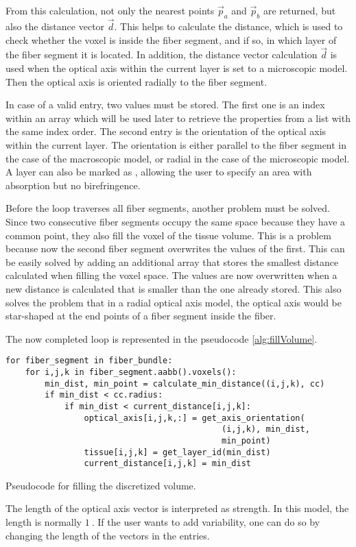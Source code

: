 From this calculation, not only the nearest points $\vec{p}_a$ and $\vec{p}_b$ are returned, but also the distance vector $\vec{d}$.
This helps to calculate the distance, which is used to check whether the voxel is inside the fiber segment, and if so, in which layer of the fiber segment it is located.
In addition, the distance vector calculation $\vec{d}$ is used when the optical axis within the current layer is set to a microscopic model. Then the optical axis is oriented radially to the fiber segment.
\par
%
In case of a valid entry, two values must be stored.
The first one is an index within an array  which will be used later to retrieve the properties from a list with the same index order.
The second entry is the orientation of the optical axis within the current layer.
The orientation is either parallel to the fiber segment in the case of the macroscopic model, or radial in the case of the microscopic model.
A layer can also be marked as , allowing the user to specify an area with absorption but no birefringence.
\par
%
Before the loop traverses all fiber segments, another problem must be solved.
Since two consecutive fiber segments occupy the same space because they have a common point, they also fill the voxel of the tissue volume.
This is a problem because now the second fiber segment overwrites the values of the first.
This can be easily solved by adding an additional array that stores the smallest distance calculated when filling the voxel space.
The values are now overwritten when a new distance is calculated that is smaller than the one already stored.
This also solves the problem that in a radial optical axis model, the optical axis would be star-shaped at the end points of a fiber segment inside the fiber.
\par
%
The now completed loop is represented in the pseudocode \cref{alg:fillVolume}.
%
\begin{lstfloat}[!tb]
\lstset{style=python}
\begin{lstlisting}[]
for fiber_segment in fiber_bundle:
    for i,j,k in fiber_segment.aabb().voxels():
        min_dist, min_point = calculate_min_distance((i,j,k), cc)
        if min_dist < cc.radius:
            if min_dist < current_distance[i,j,k]:
                optical_axis[i,j,k,:] = get_axis_orientation(
                                            (i,j,k), min_dist,
                                            min_point)
                tissue[i,j,k] = get_layer_id(min_dist)
                current_distance[i,j,k] = min_dist
\end{lstlisting}
\caption{Pseudocode for filling the discretized volume.}
\label{alg:fillVolume}
\end{lstfloat}
%
The length of the optical axis vector is interpreted as strength.
In this model, the length is normally $\SI{1}{}$.
If the user wants to add variability, one can do so by changing the length of the vectors in the entries.
%
%
%
